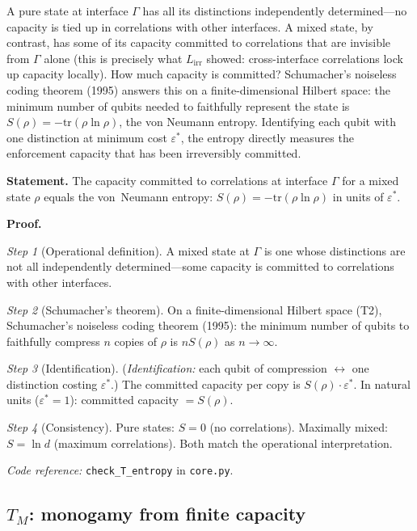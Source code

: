 \documentclass[11pt]{article}
\newcommand{\coderef}[2]{\smallskip\noindent\textit{Code reference:} \texttt{#1} in \texttt{#2}.}
\begin{document}
A pure state at interface $\Gamma$ has all its distinctions independently determined---no capacity is tied up in correlations with other interfaces.  A mixed state, by contrast, has some of its capacity committed to correlations that are invisible from $\Gamma$ alone (this is precisely what $L_{\mathrm{irr}}$ showed: cross-interface correlations lock up capacity locally).  How much capacity is committed?  Schumacher's noiseless coding theorem (1995) answers this on a finite-dimensional Hilbert space: the minimum number of qubits needed to faithfully represent the state is $S(\rho) = -\mathrm{tr}(\rho \ln \rho)$, the von Neumann entropy.  Identifying each qubit with one distinction at minimum cost $\varepsilon^*$, the entropy directly measures the enforcement capacity that has been irreversibly committed.

\begin{tcolorbox}[apfbox, title={$T_{\mathrm{entropy}}$: Von Neumann Entropy as Committed Capacity}]
\textbf{Statement.}  The capacity committed to correlations at interface $\Gamma$ for a mixed state $\rho$ equals the von~Neumann entropy: $S(\rho) = -\mathrm{tr}(\rho \ln \rho)$ in units of $\varepsilon^*$.

\smallskip\noindent\textbf{Proof.}

\textit{Step 1} (Operational definition).  A mixed state at $\Gamma$ is one whose distinctions are not all independently determined---some capacity is committed to correlations with other interfaces.

\textit{Step 2} (Schumacher's theorem).  On a finite-dimensional Hilbert space (T2), Schumacher's noiseless coding theorem (1995): the minimum number of qubits to faithfully compress $n$ copies of $\rho$ is $nS(\rho)$ as $n \to \infty$.

\textit{Step 3} (Identification).  (\textit{Identification:} each qubit of compression $\leftrightarrow$ one distinction costing $\varepsilon^*$.)  The committed capacity per copy is $S(\rho) \cdot \varepsilon^*$.  In natural units ($\varepsilon^* = 1$): committed capacity $= S(\rho)$.

\textit{Step 4} (Consistency).  Pure states: $S = 0$ (no correlations).  Maximally mixed: $S = \ln d$ (maximum correlations).  Both match the operational interpretation.

\coderef{check\_T\_entropy}{core.py}
\end{tcolorbox}


\subsection{\texorpdfstring{$T_M$}{T M}: monogamy from finite capacity}
\end{document}
